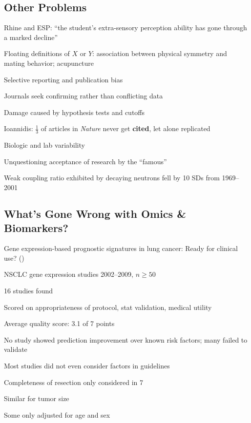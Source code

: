 \subsection{Other Problems}
\bi
\item Rhine and ESP: ``the student's extra-sensory perception ability
has gone through a marked decline''
\item Floating definitions of $X$ or $Y$: association between physical
  symmetry and mating behavior; acupuncture
\item Selective reporting and publication bias
\item Journals seek confirming rather than conflicting data
\item Damage caused by hypothesis tests and cutoffs
\item Ioannidis: $\frac{1}{3}$ of articles in \emph{Nature} never get
  \textbf{cited}, let alone replicated 
\item Biologic and lab variability
\item Unquestioning acceptance of research by the ``famous''
  \bi
  \item Weak coupling ratio exhibited by decaying neutrons fell by 10
    SDs from 1969--2001
  \ei
\ei

\subsection{What's Gone Wrong with Omics \& Biomarkers?}
\bi
\item Gene expression-based
prognostic signatures in lung cancer: Ready for clinical use? (\citet{sub10gen})
\item NSCLC gene expression studies 2002--2009, $n \geq 50$
\item 16 studies found
\item Scored on appropriateness of protocol, stat validation, medical
utility
\item Average quality score: 3.1 of 7 points
\item No study showed prediction improvement over known risk factors;
  many failed to validate
\item Most studies did not even consider factors in guidelines
 \bi
 \item Completeness of resection only considered in 7
 \item Similar for tumor size
 \item Some only adjusted for age and sex
 \ei
\ei


